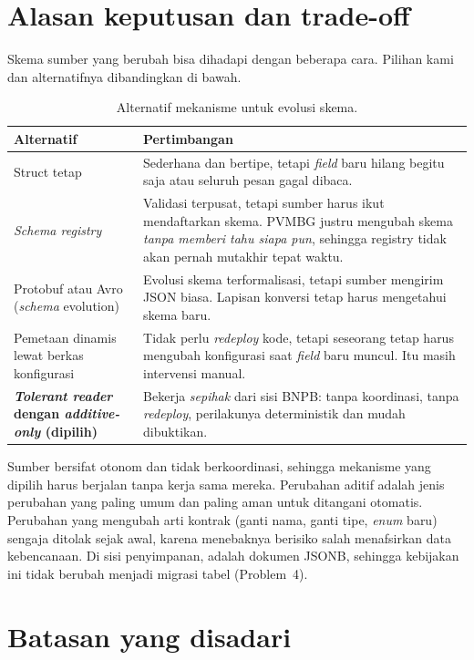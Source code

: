 \section{Alasan keputusan dan trade-off}\label{sec:p1-alasan}

Skema sumber yang berubah bisa dihadapi dengan beberapa cara. Pilihan kami dan alternatifnya dibandingkan di bawah.

\begin{table}[H]
\centering\small
\begin{tabularx}{\textwidth}{@{}L{3.6cm}Y@{}}
\toprule
\textbf{Alternatif} & \textbf{Pertimbangan}\\
\midrule
Struct tetap & Sederhana dan bertipe, tetapi \emph{field} baru hilang begitu saja atau seluruh pesan gagal dibaca.\\
\emph{Schema registry} & Validasi terpusat, tetapi sumber harus ikut mendaftarkan skema. PVMBG justru mengubah skema \emph{tanpa memberi tahu siapa pun}, sehingga registry tidak akan pernah mutakhir tepat waktu.\\
Protobuf atau Avro (\emph{schema} evolution) & Evolusi skema terformalisasi, tetapi sumber mengirim JSON biasa. Lapisan konversi tetap harus mengetahui skema baru.\\
Pemetaan dinamis lewat berkas konfigurasi & Tidak perlu \emph{redeploy} kode, tetapi seseorang tetap harus mengubah konfigurasi saat \emph{field} baru muncul. Itu masih intervensi manual.\\
\textbf{\emph{Tolerant reader} dengan \emph{additive-only} (dipilih)} & Bekerja \emph{sepihak} dari sisi BNPB: tanpa koordinasi, tanpa \emph{redeploy}, perilakunya deterministik dan mudah dibuktikan.\\
\bottomrule
\end{tabularx}
\caption{Alternatif mekanisme untuk evolusi skema.}
\end{table}

Sumber bersifat otonom dan tidak berkoordinasi, sehingga mekanisme yang dipilih harus berjalan tanpa kerja sama mereka.
Perubahan aditif adalah jenis perubahan yang paling umum dan paling aman untuk ditangani otomatis. Perubahan yang
mengubah arti kontrak (ganti nama, ganti tipe, \emph{enum} baru) sengaja ditolak sejak awal, karena menebaknya berisiko salah
menafsirkan data kebencanaan. Di sisi penyimpanan,  adalah dokumen JSONB, sehingga kebijakan ini tidak
berubah menjadi migrasi tabel (Problem~4).

\section{Batasan yang disadari}

